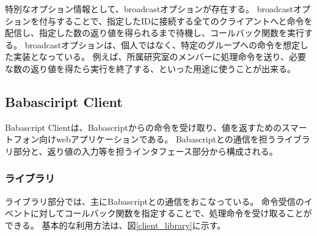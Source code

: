 \documentclass[twoside]{wiss}
\begin{document}


特別なオプション情報として、broadcastオプションが存在する。
broadcastオプションを付与することで、指定したIDに接続する全てのクライアントへと命令を配信し、指定した数の返り値を得られるまで待機し、コールバック関数を実行する。
broadcastオプションは、個人ではなく、特定のグループへの命令を想定した実装となっている。
例えば、所属研究室のメンバーに処理命令を送り、必要な数の返り値を得たら実行を終了する、といった用途に使うことが出来る。

\subsection{Babasciript Client}

Babascript Clientは、Babascriptからの命令を受け取り、値を返すためのスマートフォン向けwebアプリケーションである。
Babascriptとの通信を担うライブラリ部分と、返り値の入力等を担うインタフェース部分から構成される。

\subsubsection{ライブラリ}
ライブラリ部分では、主にBabascriptとの通信をおこなっている。
命令受信のイベントに対してコールバック関数を指定することで、処理命令を受け取ることができる。
基本的な利用方法は、図\ref{client_library}に示す。
\end{document}
